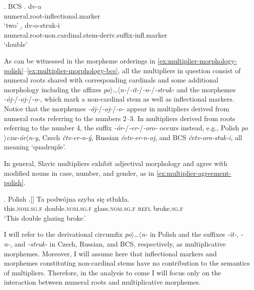\ex. BCS\label{ex:cardinal-multiplier-morphology-bcs}
\a. dv-a\label{ex:cardinal-morphology-bcs}\\
numeral.root-inflectional.marker\\
`two'
\b. dv-o-struk-i\\
numeral.root-non.cardinal.stem-deriv.suffix-infl.marker\\
`double'\label{ex:multiplier-morphology-bcs}

As can be witnessed in the morpheme orderings in \ref{ex:multiplier-morphology-polish}--\ref{ex:multiplier-morphology-bcs}, all the multipliers in question consist of numeral roots shared with corresponding cardinals and some additional morphology including the affixes \textit{po}$\rangle$\dots$\langle$\textit{n-}/\textit{-it-}/\textit{-n-}/\textit{-struk-} and the morphemes \textit{-ój-}/\textit{-oj-}/\textit{-o-}, which mark a non-cardinal stem as well as inflectional markers. Notice that the morphemes \textit{-ój-}/\textit{-oj-}/\textit{-o-} appear in multipliers derived from numeral roots referring to the numbers 2--3. In multipliers derived from roots referring to the number 4, the suffix \textit{-ór-}/\textit{-er-}/\textit{-oro-} occurs instead, e.g., Polish \textit{po}$\rangle$\textit{czw-ór}$\langle$\textit{n-y}, Czech \textit{čtv-er-n-ý}, Russian\textit{ četv-er-n-oj}, and BCS \textit{četv-oro-stuk-i}, all meaning `quadruple'.

In general, Slavic multipliers exhibit adjectival morphology and agree with modified nouns in case, number, and gender, as in \ref{ex:multiplier-agreement-polish}. 

\ex. Polish\label{ex:multiplier-agreement-polish}
\bg.[] Ta podwójna szyba się stłukła.\\
this\textsc{.nom.sg.f} double\textsc{.nom.sg.f} glass\textsc{.nom.sg.f} \textsc{refl} broke\textsc{.sg.f}\\
`This double glazing broke.'

I will refer to the derivational circumfix \textit{po}$\rangle$\dots$\langle$\textit{n-} in Polish and the suffixes \textit{-it-}, \mbox{\textit{-n-},} and \textit{-struk-} in Czech, Russian, and BCS, respectively, as multiplicative morphemes. Moreover, I will assume here that inflectional markers and morphemes constituting non-cardinal stems have no contribution to the semantics of multipliers. Therefore, in the analysis to come I will focus only on the interaction between numeral roots and multiplicative morphemes.

